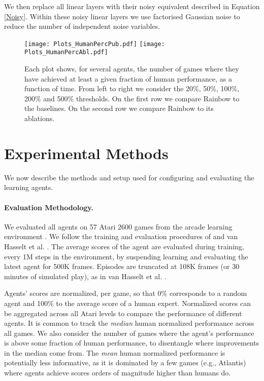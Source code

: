 \documentclass[letterpaper]{article} %
\begin{document}
We then replace all linear layers with their noisy equivalent described in Equation \eqref{Noisy}. Within these noisy linear layers we use factorised Gaussian noise \cite{FortunatoAPMOGM17} to reduce the number of independent noise variables. 

\begin{figure*}
\centering
\texttt{[image: Plots\_HumanPercPub.pdf]}
\texttt{[image: Plots\_HumanPercAbl.pdf]}
\vspace*{-2em}
\caption{Each plot shows, for several agents, the number of games where they have achieved at least a given fraction of human performance, as a function of time. From left to right we consider the 20\%, 50\%, 100\%, 200\% and 500\% thresholds. On the first row we compare Rainbow to the baselines. On the second row we compare Rainbow to its ablations.
\label{fig:num_games}}
\end{figure*}


\section{Experimental Methods}

We now describe the methods and setup used for configuring and evaluating the learning agents.

\paragraph{Evaluation Methodology.}
We evaluated all agents on 57 Atari 2600 games from the arcade learning environment \cite{bellemare2013arcade}. We follow the training and evaluation procedures of \citeauthor{Mnih2015}   and %
van Hasselt et al. . The average scores of the agent are evaluated during training, every 1M steps in the environment, by suspending learning and evaluating the latest agent for 500K frames. Episodes are truncated at 108K frames (or 30 minutes of simulated play), as in van Hasselt et al. .

Agents' scores are normalized, per game, so that 0\% corresponds to a random agent and 100\% to the average score of a human expert. Normalized scores can be aggregated across all Atari levels to compare the performance of different agents. It is common to track the \emph{median} human normalized performance across all games. We also consider the number of games where the agent's performance is above some fraction of human performance, to disentangle where improvements in the median come from. The \emph{mean} human normalized performance is potentially less informative, as it is dominated by a few games (e.g., Atlantis) where agents achieve scores orders of magnitude higher than humans do. 
\end{document}
